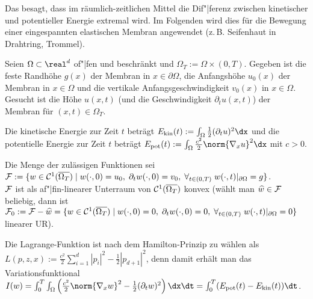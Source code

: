 \linie

\begin{Bsp}
    Das  besagt, dass im räumlich-zeitlichen Mittel
    die Dif"|ferenz zwischen
    kinetischer und potentieller Energie extremal wird.
    Im Folgenden wird dies für die Bewegung einer eingespannten elastischen Membran angewendet
    (z.\,B. Seifenhaut in Drahtring, Trommel).
    
    Seien $\Omega \subset \real^d$ of"|fen und beschränkt und $\Omega_T := \Omega \times (0, T)$.
    Gegeben ist die feste Randhöhe $g(x)$ der Membran in $x \in \partial\Omega$,
    die Anfangshöhe $u_0(x)$ der Membran in $x \in \Omega$ und
    die vertikale Anfangsgeschwindigkeit $v_0(x)$ in $x \in \Omega$.
    Gesucht ist die Höhe $u(x, t)$ (und die Geschwindigkeit $\partial_t u(x, t)$)
    der Membran für $(x, t) \in \Omega_T$.
    
    Die kinetische Energie zur Zeit $t$ beträgt
    $E_\kin(t) := \int_\Omega \frac{1}{2} (\partial_t u)^2 \dx$ und
    die potentielle Energie zur Zeit $t$ beträgt
    $E_\pot(t) := \int_\Omega \frac{c^2}{2} \norm{\nabla_x u}^2 \dx$ mit $c > 0$.
    
    Die Menge der zulässigen Funktionen sei\\
    $\mathcal{F} := \{w \in \mathcal{C}^1(\overline{\Omega_T}) \;|\; w(\cdot, 0) = u_0,\;
    \partial_t w(\cdot, 0) = v_0,\;
    \forall_{t \in (0, T)}\; w(\cdot, t)|_{\partial\Omega} = g\}$.\\
    $\mathcal{F}$ ist als af"|fin-linearer Unterraum von $\mathcal{C}^1(\overline{\Omega_T})$ konvex
    (wählt man $\widehat{w} \in \mathcal{F}$ beliebig, dann ist
    $\mathcal{F}_0 := \mathcal{F} - \widehat{w} = \{w \in \mathcal{C}^1(\overline{\Omega_T}) \;|\;
    w(\cdot, 0) = 0,\; \partial_t w(\cdot, 0) = 0,\;
    \forall_{t \in (0, T)}\; w(\cdot, t)|_{\partial\Omega} = 0\}$
    linearer UR).
    
    Die Lagrange-Funktion ist nach dem Hamilton-Prinzip zu wählen als\\
    $L(p, z, x) := \frac{c^2}{2} \sum_{i=1}^d |p_i|^2 - \frac{1}{2} |p_{d+1}|^2$,
    denn damit erhält man das Variationsfunktional\\
    $I(w) = \int_0^T \int_\Omega
    \left(\frac{c^2}{2} \norm{\nabla_x w}^2 - \frac{1}{2} (\partial_t w)^2\right) \dx\dt
    = \int_0^T (E_\pot(t) - E_\kin(t)) \dt$.
\end{Bsp}

\linie
\pagebreak

